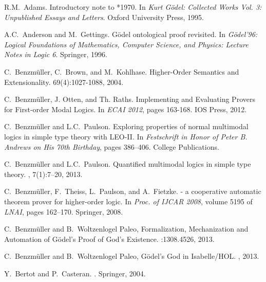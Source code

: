 \documentclass{llncs}
\begin{document}

%
\begin{thebibliography}{10}

R.M.~Adams.
\newblock Introductory note to *1970.
\newblock In {\em {Kurt G\"odel: Collected Works Vol. 3: Unpublished Essays and
  Letters}}. Oxford University Press, 1995.

A.C.~Anderson and M.~Gettings.
\newblock G\"odel ontological proof revisited.
\newblock In {\em {G\"odel'96: Logical Foundations of Mathematics, Computer
  Science, and Physics: Lecture Notes in Logic 6}}. {Springer}, 1996.

C.~Benzm{\"u}ller, C.~Brown, and M.~Kohlhase.
\newblock Higher-Order Semantics and Extensionality. 
 69(4):1027-1088, 2004.

C.~Benzm{\"u}ller, J. Otten, and Th. Raths.
\newblock Implementing and Evaluating Provers for First-order Modal
Logics. 
\newblock In {\em ECAI 2012}, pages 163-168. IOS Press, 2012.

C.~Benzm{\"u}ller and L.C.~Paulson.
\newblock Exploring properties of normal multimodal logics in simple type
  theory with {LEO-II}.
\newblock In {\em {Festschrift in Honor of {Peter B. Andrews} on His 70th
  Birthday}}, pages 386--406. College Publications.

C.~Benzm{\"u}ller and L.C.~Paulson.
\newblock Quantified multimodal logics in simple type theory.
,
  7(1):7--20, 2013.

C.~Benzm{\"u}ller, F.~Theiss, L.~Paulson, and A.~Fietzke.
 - a cooperative automatic theorem prover for higher-order
  logic.
\newblock In {\em Proc. of IJCAR 2008}, volume 5195 of {\em LNAI}, pages
  162--170. Springer, 2008.

C.~Benzm{\"u}ller and B.~Woltzenlogel Paleo,
\newblock Formalization, Mechanization and Automation of G{\"o}del's Proof of God's Existence.
:1308.4526, 2013.

C.~Benzm{\"u}ller and B.~Woltzenlogel Paleo,
\newblock G{\"o}del's God in Isabelle/HOL. 
, 2013.

Y.~Bertot and P.~Casteran.
.
\newblock Springer, 2004.


\end{thebibliography}
\end{document}

